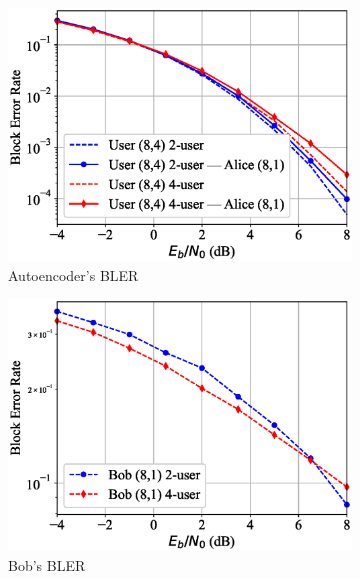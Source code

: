 \begin{figure}[tp!]
	\begin{subfigure}{0.32\textwidth}
		\includegraphics[width=\linewidth]{figs/multi_covert_autoencoder_bler_awgn}
		\caption{Autoencoder's BLER}
		\label{fig:multi_awgn_results_ae}
	\end{subfigure}
	\hspace*{\fill}
	\begin{subfigure}{0.32\textwidth}
		\includegraphics[width=\linewidth]{figs/multi_bob_bler_awgn}
		\caption{Bob's BLER}	
		\label{fig:multi_awgn_results_bob}
	\end{subfigure}
	\hspace*{\fill}
	\begin{subfigure}{0.32\textwidth}

\end{subfigure}
\end{figure}
